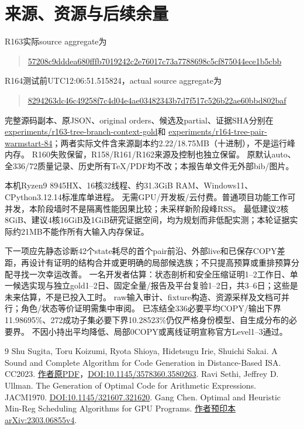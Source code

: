 \documentclass[UTF8,11pt,a4paper]{ctexart}
\begin{document}
\section{来源、资源与后续余量}
R163实际source aggregate为
\begin{quote}\footnotesize\url{57208c9dddea680fffb7019242c2e76017c73a7788698c5cf875044ece1b5cbb}\end{quote}
R164测试前UTC12:06:51.515824，actual source aggregate为
\begin{quote}\footnotesize\url{8294263dc46c49258f7c4d04e4ae03482343b7d7f517c526b22ae60bbd802baf}\end{quote}
完整源码副本、原JSON、original orders、候选及partial、证据SHA分别在
\url{experiments/r163-tree-branch-context-gold}和
\url{experiments/r164-tree-pair-warmstart-84}；两者实际文件含来源副本约2.22/18.75MB（十进制），不是运行峰内存。
R160失败保留，R158/R161/R162来源及控制也独立保留。
原默认auto、全336/72质量记录、历史所有TeX/PDF均不改；本报告单文件无外部bib/图片。

本机Ryzen9 8945HX、16核32线程、约31.3GiB RAM、Windows11、CPython3.12.14标准库单进程。
无需GPU/开发板/云付费。普通项目功能工作可并发，本阶段墙时不是隔离性能因果比较；未采样新阶段峰RSS。
最低建议2核8GiB、建议4核16GiB及1GiB研究证据空间，均为规划而非低配实测；本轮证据实际约21MB不能作所有大输入内存保证。

下一项应先静态诊断42个state耗尽的首个pair前沿、外部live和已保存COPY差距，再设计有证明的结构合并或更明确的局部候选族；不只提高预算或重排预算分配寻找一次幸运改善。
一名开发者估算：状态剖析和安全压缩证明1--2工作日、单一候选实现与独立gold1--2日、固定全量/报告及平台复验1--2日，共3--6日；这些是未来估算，不是已投入工时。
raw输入审计、fixture构造、资源采样及文档可并行；角色/状态等价证明需集中审阅。
已冻结全336必要平均COPY/输出下界11.98695\%、272成功子集必要下界10.28523\%仍仅严格身份模型、自生成分布的必要界。
不因小持出平均降低、局部0COPY或离线证明宣称官方Level1--3通过。

\begin{thebibliography}{9}
 Shu Sugita, Toru Koizumi, Ryota Shioya, Hidetsugu Irie, Shuichi Sakai.
A Sound and Complete Algorithm for Code Generation in Distance-Based ISA. CC2023.
\href{https://www.rsg.ci.i.u-tokyo.ac.jp/lab/en/assets/files/cc2023-sugita.pdf}{作者原PDF}，\href{https://doi.org/10.1145/3578360.3580263}{DOI:10.1145/3578360.3580263}.
 Ravi Sethi, Jeffrey D. Ullman. The Generation of Optimal Code for Arithmetic Expressions. JACM1970.
\href{https://doi.org/10.1145/321607.321620}{DOI:10.1145/321607.321620}.
 Gang Chen. Optimal and Heuristic Min-Reg Scheduling Algorithms for GPU Programs.
\href{https://arxiv.org/abs/2303.06855v4}{作者预印本arXiv:2303.06855v4}.
\end{thebibliography}
\end{document}

